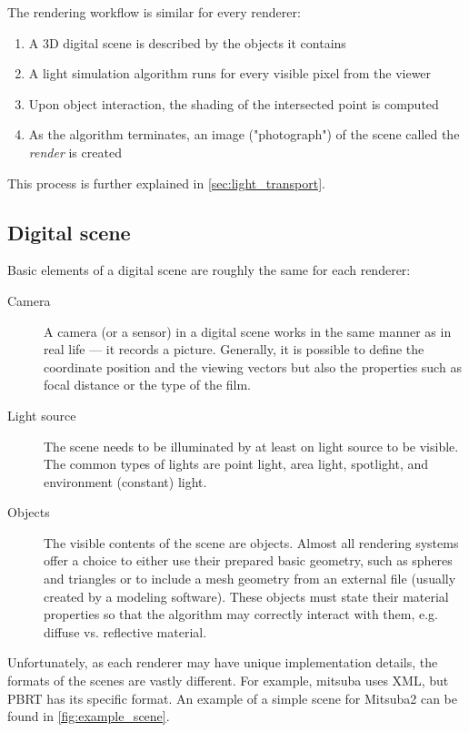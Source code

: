 The rendering workflow is similar for every renderer:
\begin{enumerate}
	\item A 3D digital scene is described by the objects it contains
	\item A light simulation algorithm runs for every visible pixel from the viewer
	\item Upon object interaction, the shading of the intersected point is computed
	\item As the algorithm terminates, an image ("photograph") of the scene called the \emph{render} is created
\end{enumerate}

This process is further explained in \autoref{sec:light_transport}.

\subsection{Digital scene}

Basic elements of a digital scene are roughly the same for each renderer:

\begin{description}
	\item[Camera] A camera (or a sensor) in a digital scene works in the same manner as in real life --- it records a picture. Generally, it is possible to define the coordinate position and the viewing vectors but also the properties such as focal distance or the type of the film.
	\item[Light source] The scene needs to be illuminated by at least on light source to be visible. The common types of lights are point light, area light, spotlight, and environment (constant) light. 
	\item[Objects] The visible contents of the scene are objects. Almost all rendering systems offer a choice to either use their prepared basic geometry, such as spheres and triangles or to include a mesh geometry from an external file (usually created by a modeling software). These objects must state their material properties so that the algorithm may correctly interact with them, e.g. diffuse vs. reflective material.
\end{description}

Unfortunately, as each renderer may have unique implementation details, the formats of the scenes are vastly different. For example, mitsuba uses XML, but PBRT has its specific format. An example of a simple scene for Mitsuba2 can be found in \autoref{fig:example_scene}.

